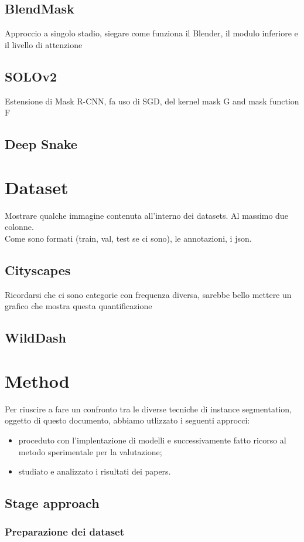 \documentclass[10pt,twocolumn,letterpaper]{article}
\begin{document}
\subsection{BlendMask}
Approccio a  singolo stadio, siegare come funziona il Blender, il modulo inferiore e il livello di attenzione
\subsection{SOLOv2}
Estensione di Mask R-CNN, fa uso di SGD, del kernel mask G and mask function F
\subsection{Deep Snake}
\section{Dataset}
Mostrare qualche immagine contenuta all'interno dei datasets. Al massimo due colonne.\\
Come sono formati (train, val, test se ci sono), le annotazioni, i json.
\subsection{Cityscapes}
Ricordarsi che ci sono categorie con frequenza diversa, sarebbe bello mettere un grafico che mostra questa quantificazione
\subsection{WildDash}
\section{Method}
Per riuscire a fare un confronto tra le diverse tecniche di instance segmentation, oggetto di questo documento, abbiamo utlizzato i seguenti approcci:
\begin{itemize}
\item proceduto con l'implentazione di modelli e successivamente fatto ricorso al metodo sperimentale per la valutazione;
\item studiato e analizzato i risultati dei papers.
\end{itemize}
\subsection{Stage approach}

\subsubsection{Preparazione dei dataset}
\end{document}
